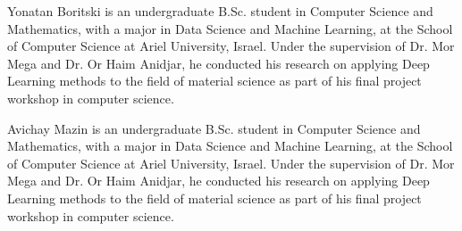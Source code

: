 \documentclass{ieeeaccess}
\begin{document}
\begin{IEEEbiography}{Yonatan Boritski} is an undergraduate B.Sc. student in Computer Science and Mathematics, with a major in Data Science and Machine Learning, at the School of Computer Science at Ariel University, Israel. Under the supervision of Dr. Mor Mega and Dr. Or Haim Anidjar, he conducted his research on applying Deep Learning methods to the field of material science as part of his final project workshop in computer science.
\end{IEEEbiography}

\begin{IEEEbiography}{Avichay Mazin} is an undergraduate B.Sc. student in Computer Science and Mathematics, with a major in Data Science and Machine Learning, at the School of Computer Science at Ariel University, Israel. Under the supervision of Dr. Mor Mega and Dr. Or Haim Anidjar, he conducted his research on applying Deep Learning methods to the field of material science as part of his final project workshop in computer science.
\end{IEEEbiography}



\EOD
\end{document}
